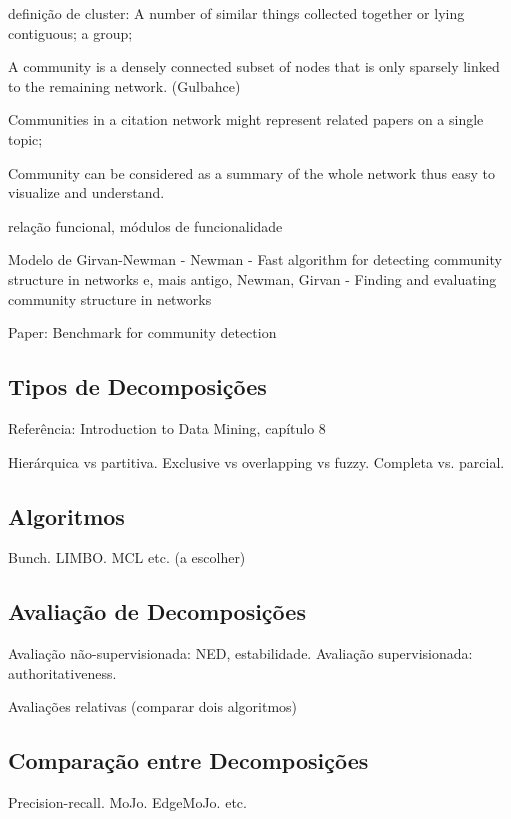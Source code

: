 \documentclass{article}
\begin{document}
definição de cluster: A number of similar things collected together or lying contiguous; a group;

A community is
a densely connected subset of nodes that is only sparsely
linked to the remaining network. (Gulbahce)

Communities in a citation network might represent
related papers on a single topic;

Community can be considered as a summary of
the whole network thus easy to visualize and
understand.

relação funcional, módulos de funcionalidade


Modelo de Girvan-Newman - Newman - Fast algorithm for detecting community structure in networks \cite{Newman2004b} e, mais antigo, Newman, Girvan - Finding and evaluating community structure in networks \cite{Newman2004a}

Paper: Benchmark for community detection \cite{Lancichinetti2008}


\subsection{Tipos de Decomposições}

Referência: Introduction to Data Mining, capítulo 8 \cite{Tan2005}

Hierárquica vs partitiva.
Exclusive vs overlapping vs fuzzy.
Completa vs. parcial.

\subsection{Algoritmos}

Bunch. LIMBO. MCL etc. (a escolher)

\subsection{Avaliação de Decomposições}

Avaliação não-supervisionada: NED, estabilidade.
Avaliação supervisionada: authoritativeness.

Avaliações relativas (comparar dois algoritmos)

\subsection{Comparação entre Decomposições}

Precision-recall.
MoJo.
EdgeMoJo.
etc.



\end{document}
